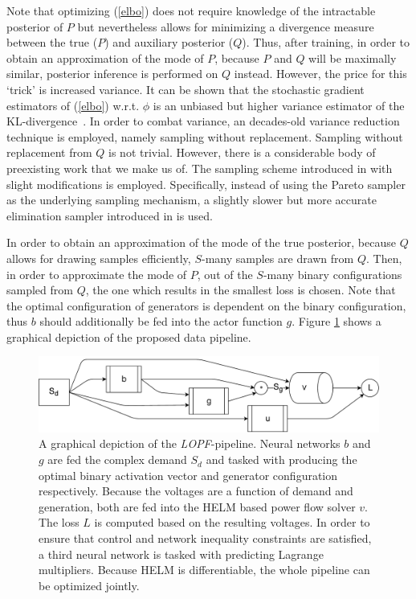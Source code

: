 Note that optimizing (\ref{elbo}) does not require knowledge of the intractable posterior of $P$ but nevertheless allows for minimizing a divergence measure between the true ($P$) and auxiliary posterior ($Q$). Thus, after training, in order to obtain an approximation of the mode of $P$, because $P$ and $Q$ will be maximally similar, posterior inference is performed on $Q$ instead.
However, the price for this `trick' is increased variance. It can be shown that the stochastic gradient estimators of (\ref{elbo}) w.r.t. $\phi$ is an unbiased but higher variance estimator of the KL-divergence~\cite{mnih2014neural}. In order to combat variance, an decades-old variance reduction technique is employed, namely sampling without replacement. Sampling without replacement from $Q$ is not trivial. However, there is a considerable body of preexisting work that we make us of. The sampling scheme introduced in \cite{shah2018without} with slight modifications is employed. Specifically, instead of using the Pareto sampler as the underlying sampling mechanism, a slightly slower but more accurate elimination sampler introduced in \cite{deville1998unequal} is used.

In order to obtain an approximation of the mode of the true posterior, because $Q$ allows for drawing samples efficiently, $S$-many samples are drawn from $Q$. Then, in order to approximate the mode of $P$, out of the $S$-many binary configurations sampled from $Q$, the one which results in the smallest loss is chosen. Note that the optimal configuration of generators is dependent on the binary configuration, thus $b$ should additionally be fed into the actor function $g$. Figure \ref{fig:pipe} shows a graphical depiction of the proposed data pipeline.
\begin{figure}
\includegraphics[width=0.95\linewidth]{krtofl/pipeline.pdf}
\caption{A graphical depiction of the \emph{LOPF}-pipeline. Neural networks $b$ and $g$ are fed the complex demand $S_d$ and tasked with producing the optimal binary activation vector and generator configuration respectively. Because the voltages are a function of demand and generation, both are fed into the HELM based power flow solver $v$. The loss $L$ is computed based on the resulting voltages. In order to ensure that control and network inequality constraints are satisfied, a third neural network is tasked with predicting Lagrange multipliers. Because HELM is differentiable, the whole pipeline can be optimized jointly.}
\label{fig:pipe}
\end{figure}

